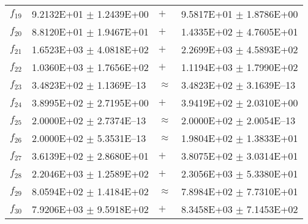 \begin{table}[ht]
\begin{tabular}{|l|ll|l|}
  $f_{19}$ & 9.2132E+01 $\pm$ 1.2439E+00 & $+$ & 9.5817E+01 $\pm$ 1.8786E+00 \\ 
  $f_{20}$ & 8.8120E+01 $\pm$ 1.9467E+01 & $+$ & 1.4335E+02 $\pm$ 4.7605E+01 \\ 
  $f_{21}$ & 1.6523E+03 $\pm$ 4.0818E+02 & $+$ & 2.2699E+03 $\pm$ 4.5893E+02 \\ 
  $f_{22}$ & 1.0360E+03 $\pm$ 1.7656E+02 & $+$ & 1.1194E+03 $\pm$ 1.7990E+02 \\ 
  $f_{23}$ & 3.4823E+02 $\pm$ 1.1369E--13 & $\approx$ & 3.4823E+02 $\pm$ 3.1639E--13 \\ 
  $f_{24}$ & 3.8995E+02 $\pm$ 2.7195E+00 & $+$ & 3.9419E+02 $\pm$ 2.0310E+00 \\ 
  $f_{25}$ & 2.0000E+02 $\pm$ 2.7374E--13 & $\approx$ & 2.0000E+02 $\pm$ 2.0054E--13 \\ 
  $f_{26}$ & 2.0000E+02 $\pm$ 5.3531E--13 & $\approx$ & 1.9804E+02 $\pm$ 1.3833E+01 \\ 
  $f_{27}$ & 3.6139E+02 $\pm$ 2.8680E+01 & $+$ & 3.8075E+02 $\pm$ 3.0314E+01 \\ 
  $f_{28}$ & 2.2046E+03 $\pm$ 1.2589E+02 & $+$ & 2.3056E+03 $\pm$ 5.3380E+01 \\ 
  $f_{29}$ & 8.0594E+02 $\pm$ 1.4184E+02 & $\approx$ & 7.8984E+02 $\pm$ 7.7310E+01 \\ 
  $f_{30}$ & 7.9206E+03 $\pm$ 9.5918E+02 & $+$ & 8.3458E+03 $\pm$ 7.1453E+02 \\ 
   \hline
\end{tabular}
\end{table}

